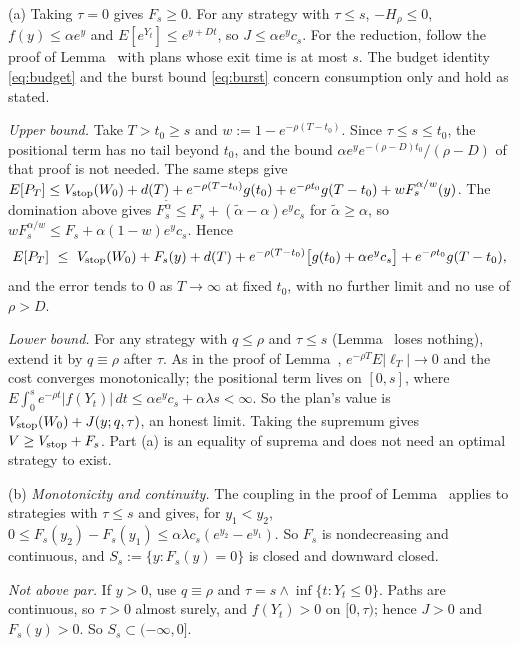 (a) Taking $\tau=0$ gives $F_s\ge0$. For any strategy with $\tau\le s$, $-H_\rho\le0$, $f(y)\le\alpha e^y$ and $E[e^{Y_t}]\le e^{y+Dt}$, so $J\le\alpha e^y c_s$. For the reduction, follow the proof of Lemma~ with plans whose exit time is at most $s$. The budget identity \eqref{eq:budget} and the burst bound \eqref{eq:burst} concern consumption only and hold as stated.

\emph{Upper bound.} Take $T>t_0\ge s$ and $w:=1-e^{-\rho(T-t_0)}$. Since $\tau\le s\le t_0$, the positional term has no tail beyond $t_0$, and the bound $\alpha e^ye^{-(\rho-D)t_0}/(\rho-D)$ of that proof is not needed. The same steps give $E[P_T]\le V_{\rm stop}(W_0)+d(T)+e^{-\rho(T-t_0)}g(t_0)+e^{-\rho t_0}g(T-t_0)+wF_s^{\alpha/w}(y)$. The domination above gives $F_s^{\tilde\alpha}\le F_s+(\tilde\alpha-\alpha)e^yc_s$ for $\tilde\alpha\ge\alpha$, so $wF_s^{\alpha/w}\le F_s+\alpha(1-w)e^yc_s$. Hence
\[
E[P_T]\ \le\ V_{\rm stop}(W_0)+F_s(y)+d(T)+e^{-\rho(T-t_0)}\big[g(t_0)+\alpha e^yc_s\big]+e^{-\rho t_0}g(T-t_0),
\]
and the error tends to $0$ as $T\to\infty$ at fixed $t_0$, with no further limit and no use of $\rho>D$.

\emph{Lower bound.} For any strategy with $q\le\rho$ and $\tau\le s$ (Lemma~ loses nothing), extend it by $q\equiv\rho$ after $\tau$. As in the proof of Lemma~, $e^{-\rho T}E|\ell_T|\to0$ and the cost converges monotonically; the positional term lives on $[0,s]$, where $E\int_0^se^{-\rho t}|f(Y_t)|\,dt\le\alpha e^yc_s+\alpha\lambda s<\infty$. So the plan's value is $V_{\rm stop}(W_0)+J(y;q,\tau)$, an honest limit. Taking the supremum gives $V\ge V_{\rm stop}+F_s$. Part (a) is an equality of suprema and does not need an optimal strategy to exist.

(b) \emph{Monotonicity and continuity.} The coupling in the proof of Lemma~ applies to strategies with $\tau\le s$ and gives, for $y_1<y_2$, $0\le F_s(y_2)-F_s(y_1)\le\alpha\lambda c_s(e^{y_2}-e^{y_1})$. So $F_s$ is nondecreasing and continuous, and $S_s:=\{y:F_s(y)=0\}$ is closed and downward closed.

\emph{Not above par.} If $y>0$, use $q\equiv\rho$ and $\tau=s\wedge\inf\{t:Y_t\le0\}$. Paths are continuous, so $\tau>0$ almost surely, and $f(Y_t)>0$ on $[0,\tau)$; hence $J>0$ and $F_s(y)>0$. So $S_s\subset(-\infty,0]$.

